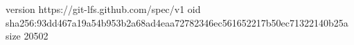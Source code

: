 version https://git-lfs.github.com/spec/v1
oid sha256:93dd467a19a54b953b2a68ad4eaa72782346ec561652217b50ec71322140b25a
size 20502
